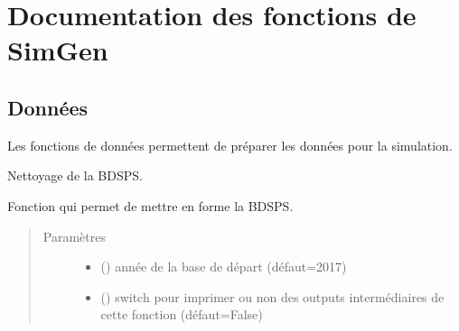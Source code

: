 \documentclass[letterpaper,10pt,french]{sphinxmanual}
\begin{document}
\begin{sphinxVerbatim}[commandchars=\\\{\}]
  
\end{sphinxVerbatim}


\chapter{Documentation des fonctions de SimGen}
\label{\detokenize{code:module-simgen}}\label{\detokenize{code:documentation-des-fonctions-de-simgen}}\label{\detokenize{code::doc}}

\section{Données}
\label{\detokenize{code:donnees}}
Les fonctions de données permettent de préparer les données pour la simulation.

\begin{fulllineitems}
\label{\detokenize{code:simgen.bdsps}}
Nettoyage de la BDSPS.

Fonction qui permet de mettre en forme la BDSPS.
\begin{quote}\begin{description}
\item[{Paramètres}] \leavevmode\begin{itemize}
\item {} 
 () \textendash{} année de la base de départ (défaut=2017)

\item {} 
 () \textendash{} switch pour imprimer ou non des outputs intermédiaires de cette fonction (défaut=False)

\end{itemize}

\end{description}\end{quote}

\end{fulllineitems}
\end{document}
